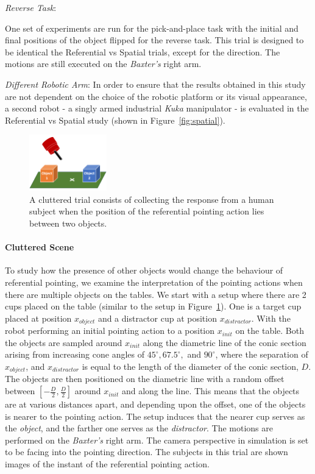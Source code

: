 \noindent\textit{Reverse Task}: 

One set of experiments are run for the pick-and-place task with the initial and final positions of the object flipped for the reverse task. This trial is designed to be identical the Referential vs Spatial trials, except for the direction. The motions are still executed on the \textit{Baxter's} right arm. 


\noindent\textit{Different Robotic Arm}:
In order to ensure that the results obtained in this study are not dependent on the choice of the robotic platform or its visual appearance, a second robot - a singly armed industrial \textit{Kuka} manipulator - is evaluated in the Referential vs Spatial study (shown in Figure~\ref{fig:spatial}).

\begin{figure}[t]
    \centering
    \includegraphics[width=0.3\textwidth]{figures/clutter_trial.png}
    \caption{A cluttered trial consists of collecting the response from a human subject when the position of the referential pointing action lies between two objects.}
    \label{fig:cluttered_trial}
\end{figure}
\paragraph{Cluttered Scene}
To study how the presence of other objects would change the behaviour of referential pointing, we examine the interpretation of the pointing actions when there are multiple objects on the tables. We start with a setup where there are 2 cups placed on the table (similar to the setup in Figure~\ref{fig:cluttered_trial}). One is a target cup placed at position $x_{object}$ and a distractor cup at position $x_{distractor}$. With the robot performing an initial pointing action to a position $x_{init}$ on the table. Both the objects are sampled around $x_{init}$ along the diametric line of the conic section arising from increasing cone angles of $45^\circ, 67.5^\circ, $ and $90^\circ$, where the separation of $x_{object}$, and $x_{distractor}$ is equal to the length of the diameter of the conic section, $D$. The objects are then positioned on the diametric line with a random offset between $[-\frac{D}{2}, \frac{D}{2}]$ around $x_{init}$ and along the line. This means that the objects are at various distances apart, and depending upon the offset, one of the objects is nearer to the pointing action. The setup induces that the nearer cup serves as the \textit{object}, and the farther one serves as the \textit{distractor}. The motions are performed on the \textit{Baxter's} right arm. The camera perspective in simulation is set to be facing into the pointing direction. The subjects in this trial are shown images of the instant of the referential pointing action.




